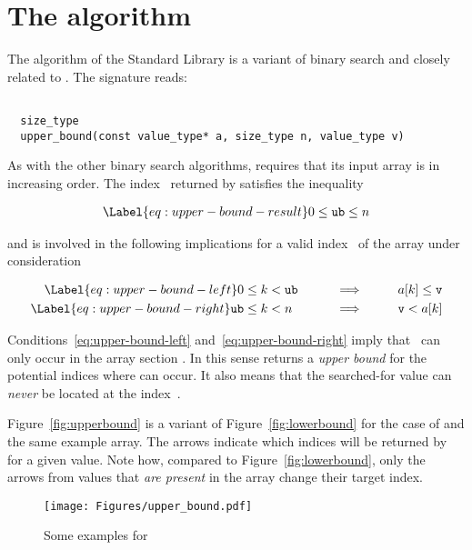 
\section{The \upperbound algorithm}

The \upperbound algorithm of the \cxx Standard Library \cite[\S 28.7.3.2]{cxx-17-draft} is a
variant of binary search and closely related to .
The signature reads:

\begin{lstlisting}[style = acsl-block]

  size_type 
  upper_bound(const value_type* a, size_type n, value_type v)
\end{lstlisting}

As with the other binary search algorithms, \upperbound requires that
its input array is in increasing order.
The index~ returned by \upperbound satisfies the inequality

\begin{align}
\Label{eq:upper-bound-result}
0 \leq \mathtt{ub} \leq n  
\end{align}

and is involved in the following implications for a valid index~ of the array
under consideration

\begin{alignat}{3}
\Label{eq:upper-bound-left}
0 &\leq k < \mathtt{ub} &&\qquad\Longrightarrow\qquad && a[k] \leq \mathtt{v} \\
\Label{eq:upper-bound-right}
\mathtt{ub} &\leq k < n &&\qquad\Longrightarrow\qquad &&\mathtt{v} < a[k]
\end{alignat}

Conditions~\eqref{eq:upper-bound-left} and~\eqref{eq:upper-bound-right} imply that~
can only occur in the array section .
In this sense \upperbound returns a \emph{upper bound} for the
potential indices where  can occur.
It also means that the searched-for value  can
\emph{never} be located at the index~.

Figure~\ref{fig:upperbound} is a variant of Figure~\ref{fig:lowerbound} for the case
of \upperbound and the same example array.
The arrows indicate which indices will be returned by \upperbound for a given value.
Note how, compared to Figure~\ref{fig:lowerbound}, only the arrows from values
that \emph{are present} in the array change their target index.

\begin{figure}[hbt]
\centering
\texttt{[image: Figures/upper\_bound.pdf]}
\caption{Some examples for \upperbound}
\end{figure}

